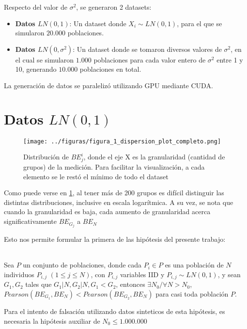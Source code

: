 Respecto del valor de $\sigma^2$, se generaron 2 datasets:

\begin{itemize}
    \item \textbf{Datos $LN(0,1)$}: Un dataset donde $X_i \sim LN(0,1)$, para el que se simularon $20.000$ poblaciones.
    \item \textbf{Datos $LN(0,\sigma^2)$}: Un dataset donde se tomaron diversos valores de $\sigma^2$, en el cual se simularon $1.000$ poblaciones para cada valor entero de $\sigma^2$ entre 1 y 10, generando $10.000$ poblaciones en total.
\end{itemize}

La generación de datos se paralelizó utilizando GPU mediante CUDA\cite{lasorsa2024simluacion_cuda}.

\section{Datos $LN(0,1)$}

\begin{figure}[H] %
    \centering %
    \texttt{[image: ../figuras/figura\_1\_dispersion\_plot\_completo.png]} %
    \caption{Distribución de $BE_j^i$, donde el eje X es la granularidad (cantidad de grupos) de la medición. Para facilitar la visualización, a cada elemento se le restó el mínimo de todo el dataset}
    \label{fig:1} %
\end{figure}

Como puede verse en \ref{fig:1}, al tener más de 200 grupos es difícil distinguir las distintas distribuciones, inclusive en escala logarítmica. A su vez, se nota que cuando la granularidad es baja, cada aumento de granularidad acerca significativamente $BE_{G_j}$ a $BE_N$

Esto nos permite formular la primera de las hipótesis del presente trabajo:

\begin{hipotesis}\label{hipo:1}
    \\
    Sea $P$ un conjunto de poblaciones, donde cada $P_i \in P$ es una población de $N$ individuos $P_{i,j}$ $(1 \leq j \leq N)$, con $P_{i,j}$ variables IID y $P_{i,j} \sim LN(0,1)$, y sean $G_1, G_2$ tales que $G_1|N, G_2|N, G_1 < G_2$, entonces $\exists N_0 / \forall N > N_0 $, $Pearson(BE_{G_1},BE_N) < Pearson(BE_{G_2},BE_N)$ para casi toda población $P$.
    
    Para el intento de falsación utilizando datos sinteticos de esta hipótesis, es necesaria la hipótesis auxiliar de $N_0 \leq 1.000.000$    
%
\end{hipotesis}

